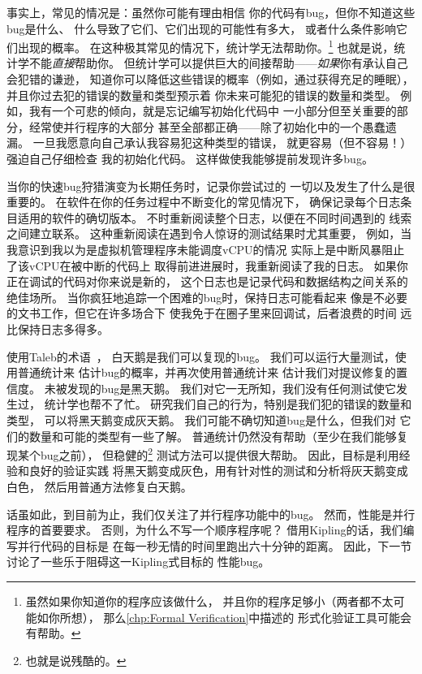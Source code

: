 事实上，常见的情况是：虽然你可能有理由相信
你的代码有bug，但你不知道这些bug是什么、
什么导致了它们、它们出现的可能性有多大，
或者什么条件影响它们出现的概率。
在这种极其常见的情况下，统计学无法帮助你。\footnote{
	虽然如果你知道你的程序应该做什么，
	并且你的程序足够小（两者都不太可能如你所想），
	那么\cref{chp:Formal Verification}中描述的
	形式化验证工具可能会有帮助。}
也就是说，统计学不能\emph{直接}帮助你。
但统计学可以提供巨大的间接帮助——\emph{如果}你有承认自己会犯错的谦逊，
知道你可以降低这些错误的概率（例如，通过获得充足的睡眠），
并且你过去犯的错误的数量和类型预示着
你未来可能犯的错误的数量和类型。
例如，我有一个可悲的倾向，就是忘记编写初始化代码中
一小部分但至关重要的部分，经常使并行程序的大部分
甚至全部都正确——除了初始化中的一个愚蠢遗漏。
一旦我愿意向自己承认我容易犯这种类型的错误，
就更容易（但不容易！）强迫自己仔细检查
我的初始化代码。
这样做使我能够提前发现许多bug。

当你的快速bug狩猎演变为长期任务时，记录你尝试过的
一切以及发生了什么是很重要的。
在软件在你的任务过程中不断变化的常见情况下，
确保记录每个日志条目适用的软件的确切版本。
不时重新阅读整个日志，以便在不同时间遇到的
线索之间建立联系。
这种重新阅读在遇到令人惊讶的测试结果时尤其重要，
例如，当我意识到我以为是虚拟机管理程序未能调度vCPU的情况
实际上是中断风暴阻止了该vCPU在被中断的代码上
取得前进进展时，我重新阅读了我的日志。
如果你正在调试的代码对你来说是新的，
这个日志也是记录代码和数据结构之间关系的绝佳场所。
当你疯狂地追踪一个困难的bug时，保持日志可能看起来
像是不必要的文书工作，但它在许多场合下
使我免于在圈子里来回调试，后者浪费的时间
远比保持日志多得多。

使用Taleb的术语~\cite{NassimTaleb2007BlackSwan}，
白天鹅是我们可以复现的bug。
我们可以运行大量测试，使用普通统计来
估计bug的概率，并再次使用普通统计来
估计我们对提议修复的置信度。
未被发现的bug是黑天鹅。
我们对它一无所知，我们没有任何测试使它发生过，
统计学也帮不了忙。
研究我们自己的行为，特别是我们犯的错误的数量和类型，
可以将黑天鹅变成灰天鹅。
我们可能不确切知道bug是什么，但我们对
它们的数量和可能的类型有一些了解。
普通统计仍然没有帮助（至少在我们能够复现某个bug之前），
但稳健的\footnote{
	也就是说残酷的。}
测试方法可以提供很大帮助。
因此，目标是利用经验和良好的验证实践
将黑天鹅变成灰色，用有针对性的测试和分析将灰天鹅变成白色，
然后用普通方法修复白天鹅。

话虽如此，到目前为止，我们仅关注了并行程序功能中的bug。
然而，性能是并行程序的首要要求。
否则，为什么不写一个顺序程序呢？
借用Kipling的话，我们编写并行代码的目标是
在每一秒无情的时间里跑出六十分钟的距离。
因此，下一节讨论了一些乐于阻碍这一Kipling式目标的
性能bug。

